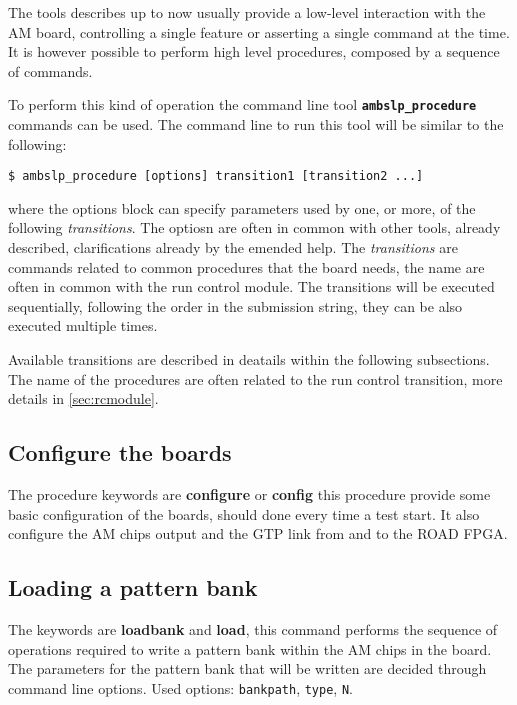 The tools describes up to now usually provide a low-level
interaction with the AM board, controlling a single feature
or asserting a single command at the time. It is however 
possible to perform high level procedures, composed by a sequence
of commands.

To perform this kind of operation the command line tool
\textbf{\texttt{ambslp\_procedure}} commands can be used. The
command line to run this tool will be similar to the
following:
\begin{verbatim}
$ ambslp_procedure [options] transition1 [transition2 ...]
\end{verbatim}
where the options block can specify parameters used by one, or more,
of the following \emph{transitions}. The optiosn are often in common
with other tools, already described, clarifications already by the emended help.
The \emph{transitions} are commands related to common procedures
that the board needs, the name are often in common with the
run control module. The transitions will be executed
sequentially, following the order in the submission string, they can 
be also executed multiple times.

Available transitions are described in deatails within the following 
subsections. The name of the procedures are often related to the run
control transition, more details in \ref{sec:rcmodule}.

\subsection{Configure the boards}
\label{sec:procconfigure}

The procedure keywords are \textbf{configure} or \textbf{config}  this procedure provide some basic configuration of the boards, should done every time a test start. It
    also configure the AM chips output and the GTP link from and to the
    ROAD FPGA.

\subsection{Loading a pattern bank}
\label{sec:procloadbank}
The keywords are \textbf{loadbank} and \textbf{load}, 
this command performs the
	sequence of operations required to write a pattern bank within
	the AM chips in the board. The parameters for the pattern bank 
	that will be written are decided through command line options.
	Used options: \texttt{bankpath}, \texttt{type}, \texttt{N}.
    
